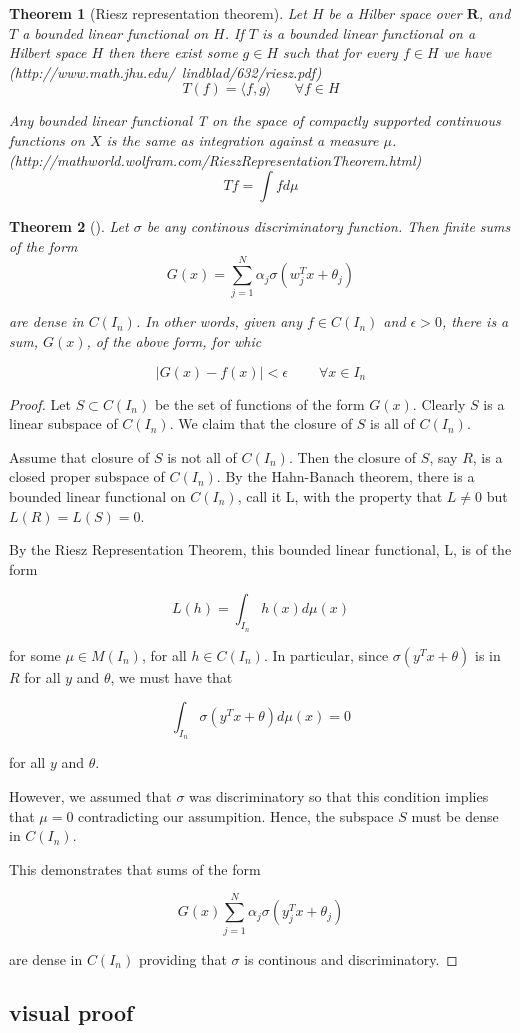 \documentclass[]{article}
\newtheorem{theorem}{Theorem}[section]
\theoremstyle{definition}
\begin{document}
\begin{theorem}[Riesz representation theorem]
	Let $H$ be a Hilber space over $\mathbf{R}$, and $T$ a bounded linear functional on $H$. If $T$ is a bounded linear functional on a Hilbert space $H$ then there exist some $g \in H$ such that for every $f \in H$ we have (http://www.math.jhu.edu/~lindblad/632/riesz.pdf)
	$$
	T(f) = \langle f,g \rangle \;\;\;\;\;\; \forall f \in H
	$$
	
	Any bounded linear functional T on the space of compactly supported continuous functions on $X$ is the same as integration against a measure $\mu$. (http://mathworld.wolfram.com/RieszRepresentationTheorem.html)
	$$
	Tf = \int f d\mu
	$$
	
\end{theorem}

\begin{theorem}[]
	Let $\sigma$ be any continous discriminatory function. Then finite sums of the form
$$
G\left(x\right) = \sum_{j=1}^{N} \alpha_j \sigma\left(w_j^Tx + \theta_j\right)
$$

are dense in $C(I_n)$. In other words, given any $f \in C(I_n)$ and $\epsilon >0$, there is a sum, $G(x)$, of the above form, for whic

$$
|G(x) - f(x)| < \epsilon \;\;\;\;\;\;\;\; \forall x \in I_n
$$
\end{theorem}

\begin{proof}
Let $S \subset C(I_n)$ be the set of functions of the form $G(x)$. Clearly $S$ is a linear subspace of $C(I_n)$. We claim that the closure of $S$ is all of $C(I_n)$. 

Assume that closure of $S$ is not all of $C(I_n)$. Then the closure of $S$, say $R$, is a closed proper subspace of $C(I_n)$. By the Hahn-Banach theorem, there is a bounded linear functional on $C(I_n)$, call it L, with the property that $L \neq 0$ but $L(R) = L(S) = 0$.

By the Riesz Representation Theorem, this bounded linear functional, L, is of the form 

$$
L(h) = \int_{I_n} h(x)d\mu(x)
$$

for some $\mu \in M(I_n)$, for all $h \in C(I_n)$. In particular, since $\sigma(y^Tx + \theta)$ is in $R$ for all $y$ and $\theta$, we must have that

$$
\int_{I_n} \sigma \left(y^Tx + \theta \right) d\mu(x) = 0
$$

for all $y$ and $\theta$.

However, we assumed that $\sigma$ was discriminatory so that this condition implies that $\mu = 0$ contradicting our assumpition. Hence, the subspace $S$ must be dense in $C(I_n)$.

This demonstrates that sums of the form

$$
G(x) \sum_{j=1}^{N} \alpha_j \sigma\left(y_j^Tx + \theta_j\right)
$$

are dense in $C(I_n)$ providing that $\sigma$ is continous and discriminatory.

\end{proof}


\subsection{visual proof}
\end{document}

